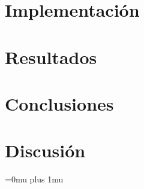 \documentclass[journal, onecolumn]{IEEEtran}
\numberwithin{equation}{section}
\numberwithin{figure}{section}
\numberwithin{table}{section}
\begin{document}
    \section{Implementación}
    
    
    

    \section{Resultados}
    


    \section{Conclusiones}
    


    \section{Discusión}


    \Urlmuskip=0mu plus 1mu\relax
    
    
\end{document}
